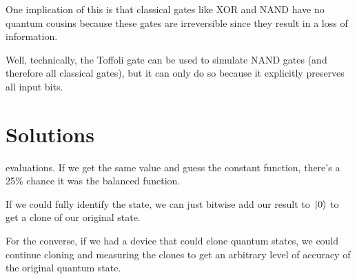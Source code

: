 One implication of this is that classical gates like \textsc{XOR} and \textsc{NAND} have no quantum cousins because these gates are irreversible since they result in a loss of information. 

Well, technically, the Toffoli gate can be used to simulate \textsc{NAND} gates (and therefore all classical gates), but it can only do so because it explicitly preserves all input bits. 

\section{Solutions}

 evaluations. If we get the same value and guess the constant function, there's a 25\% chance it was the balanced function. 

\exercise 
If we could fully identify the state, we can just bitwise add our result to $\ket*{0}$ to get a clone of our original state. 

For the converse, if we had a device that could clone quantum states, we could continue cloning and measuring the clones to get an arbitrary level of accuracy of the original quantum state. 